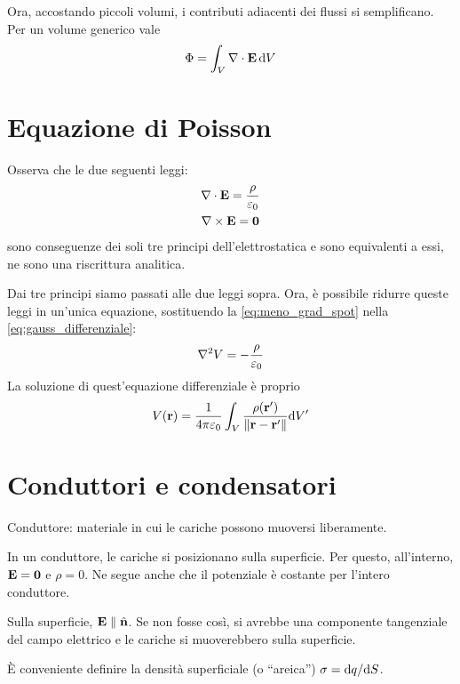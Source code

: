 Ora, accostando piccoli volumi, i contributi adiacenti dei flussi si semplificano. Per un volume generico vale
\begin{equation}
    \Phi = \int_V \nabla \cdot \mathbf{E} \, \mathrm{d} V
\end{equation}

\section{Equazione di Poisson}

Osserva che le due seguenti leggi:
\begin{gather}
\label{eq:gauss_differenziale}
    \nabla \cdot \mathbf{E} = \frac{\rho}{\varepsilon_0} \\
    \nabla \times \mathbf{E} = \mathbf{0}
\end{gather}
sono conseguenze dei soli tre principi dell'elettrostatica e sono equivalenti a essi, ne sono una riscrittura analitica.

Dai tre principi siamo passati alle due leggi sopra.
Ora, è possibile ridurre queste leggi in un'unica equazione, sostituendo la \eqref{eq:meno_grad_spot} nella \eqref{eq:gauss_differenziale}:
\begin{equation}
    \nabla^2 V = - \frac{\rho}{\varepsilon_0}
\end{equation}
La soluzione di quest'equazione differenziale è proprio
\begin{equation}
    V(\mathbf{r}) = \frac{1}{4\pi \varepsilon_0} \int_V \frac{\rho(\mathbf{r}')}{\left\lVert \mathbf{r} - \mathbf{r}' \right\rVert} \mathrm{d} V'
\end{equation}


\section{Conduttori e condensatori}

Conduttore: materiale in cui le cariche possono muoversi liberamente.

In un conduttore, le cariche si posizionano sulla superficie.
Per questo, all'interno, $\mathbf{E} = \mathbf{0}$ e $\rho = 0$.
Ne segue anche che il potenziale è costante per l'intero conduttore.

Sulla superficie, $\mathbf{E} \parallel \hat{\mathbf{n}}$.
Se non fosse così, si avrebbe una componente tangenziale del campo elettrico e le cariche si muoverebbero sulla superficie.

È conveniente definire la densità superficiale (o ``areica'') $\sigma = \mathrm{d} q / \mathrm{d} S$.

